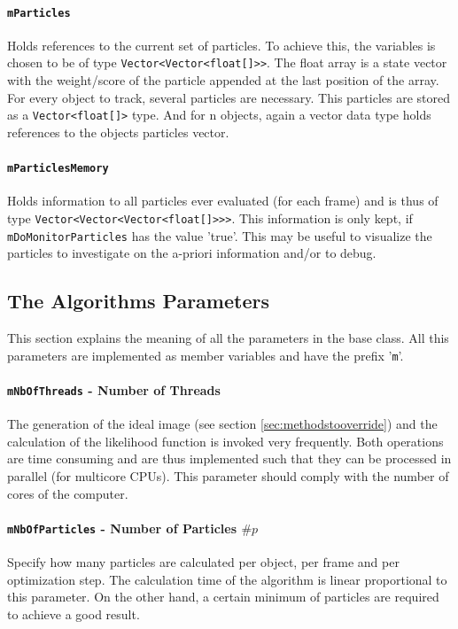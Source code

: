 \documentclass{scrartcl}
\begin{document}
\paragraph{\texttt{mParticles}} Holds references to the current set of particles. To achieve this, the variables is chosen to be of type \lstinline[]{Vector<Vector<float[]>>}. The float array is a state vector with the weight/score of the particle appended at the last position of the array. For every object to track, several particles are necessary. This particles are stored as a \lstinline[]{Vector<float[]>} type. And for n objects, again a vector data type holds references to the objects particles vector.

\paragraph{\texttt{mParticlesMemory}} Holds information to all particles ever evaluated (for each frame) and is thus of type \lstinline[]{Vector<Vector<Vector<float[]>>>}. This information is only kept, if \texttt{mDoMonitorParticles} has the value 'true'. This may be useful to visualize the particles to investigate on the a-priori information and/or to debug.

\subsection{The Algorithms Parameters}
This section explains the meaning of all the parameters in the base class. All this parameters are implemented as member variables and have the prefix '\texttt{m}'.
\paragraph{\texttt{mNbOfThreads} - Number of Threads} The generation of the ideal image (see section \ref{sec:methodstooverride}) and the calculation of the likelihood function is invoked very frequently. Both operations are time consuming and are thus implemented such that they can be processed in parallel (for multicore CPUs). This parameter should comply with the number of cores of the computer.

\paragraph{\texttt{mNbOfParticles} - Number of Particles $\#p$} Specify how many particles are calculated per object, per frame and per optimization step. The calculation time of the algorithm is linear proportional to this parameter. On the other hand, a certain minimum of particles are required to achieve a good result.
\end{document}
